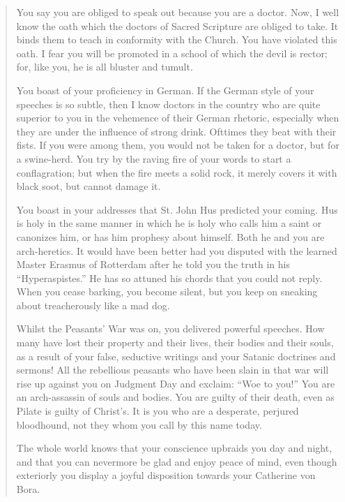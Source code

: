 \begin{quote}
You say you are obliged to speak out because you are a doctor. Now,
I well know the oath which the doctors of Sacred Scripture are obliged to
take. It binds them to teach in conformity with the Church. You have
violated this oath. I fear you will be promoted in a school of which the devil
is rector; for, like you, he is all bluster and tumult.

You boast of your proficiency in German. If the German style of your
speeches is so subtle, then I know doctors in the country who are quite superior
to you in the vehemence of their German rhetoric, especially when
they are under the influence of strong drink. Ofttimes they beat with their
fists. If you were among them, you would not be taken for a doctor, but
for a swine-herd. You try by the raving fire of your words to start
a conflagration; but when the fire meets a solid rock, it merely covers it with
black soot, but cannot damage it.

You boast in your addresses that St. John Hus predicted your coming.
Hus is holy in the same manner in which he is holy who calls him a saint
or canonizes him, or has him prophesy about himself. Both he and you are
arch-heretics. It would have been better had you disputed with the learned
Master Erasmus of Rotterdam after he told you the
truth in his “Hyperaspistes.” He has so attuned his chords that you
could not reply. When you cease barking, you become silent, but you keep on sneaking about
treacherously like a mad dog.

Whilst the Peasants’ War was on, you delivered powerful speeches. How
many have lost their property and their lives, their bodies and their souls, as
a result of your false, seductive writings and your Satanic doctrines and
sermons! All the rebellious peasants who have been slain in that war will rise
up against you on Judgment Day and exclaim: “Woe to you!” You are an
arch-assassin of souls and bodies. You are guilty of their death, even as Pilate
is guilty of Christ’s. It is you who are a desperate, perjured bloodhound, not
they whom you call by this name today.

The whole world knows that your conscience upbraids you day and night,
and that you can nevermore be glad and enjoy peace of mind, even though
exteriorly you display a joyful disposition towards your Catherine von Bora.


\end{quote}
